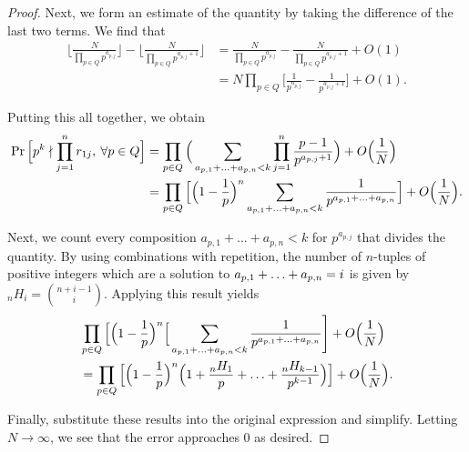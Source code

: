 \documentclass[12pt]{amsart}
\theoremstyle{definition}
\begin{document}
\begin{proof}
	Next, we form an estimate of the quantity by taking the difference of the last two terms. We find that
	\begin{align*}
		\Big\lfloor \frac{N}{\prod_{p\in Q} p^{a_{p,j}}} \Big\rfloor - \Big\lfloor \frac{N}{\prod_{p\in Q} p^{a_{p,j}+1}} \Big\rfloor &=
		\frac{N}{\prod_{p\in Q} p^{a_{p,j}}} -  \frac{N}{\prod_{p\in Q} p^{a_{p,j}+1}} + O(1)\\&=
		N\prod_ {p\in Q}\Big[ \frac{1}{ p^{a_{p,j}}}  -  \frac{1}{ p^{a_{p,j}+1}} \Big]+ O(1).
	\end{align*}
	
	Putting this all together, we obtain
	\begin{align*}
	\Pr\Big[p^k\nmid \prod_{j=1}^{n}r_{1j},\: \forall p\in Q\Big] &= \prod_{p\in Q} \Big(\sum_{a_{p,1}+\mathellipsis+a_{p,n}<k}\prod_{j=1}^{n}\frac{p-1}{p^{a_{p,j}+1}}\Big)+O\Big(\frac{1}{N}\Big)\\
		&=\prod_{p\in Q}\Big[\Big(1-\frac{1}{p}\Big)^n\sum_{a_{p,1}+\mathellipsis+a_{p,n}<k}\frac{1}{p^{a_{p,1}+\mathellipsis+a_{p,n}}}\Big]+O\Big(\frac{1}{N}\Big).
	\end{align*}

	Next, we count every composition $a_{p,1}+ ... +a_{p,n}<k$ for $p^{a_{p,j}}$ that divides the quantity. By using combinations with repetition, the number of $n$-tuples of positive integers which are a solution to \(a_{p,1}+\mathellipsis+a_{p,n}=i\) is given by $_nH_i = \binom{n+i-1}{i}$. Applying this result yields
	\begin{align*}
		&\prod_{p\in Q}\Big[\Big(1-\frac{1}{p}\Big)^n\Big[\sum_{a_{p,1}+\mathellipsis+a_{p,n}<k}\frac{1}{p^{a_{p,1}+\mathellipsis+a_{p,n}}}\Biggr]+O\Big(\frac{1}{N}\Big)\\
		&= \prod_{p\in Q}\Big[\Big(1-\frac{1}{p}\Big)^n\Big(1+\frac{_nH_1}{p}+\mathellipsis+\frac{_nH_{k-1}}{p^{k-1}}\Big)\Big]+O\Big(\frac{1}{N}\Big).
	\end{align*}
	
	Finally, substitute these results into the original expression and simplify. Letting $N\to \infty$, we see that the error approaches 0 as desired.
\end{proof}




\newpage
\end{document}
